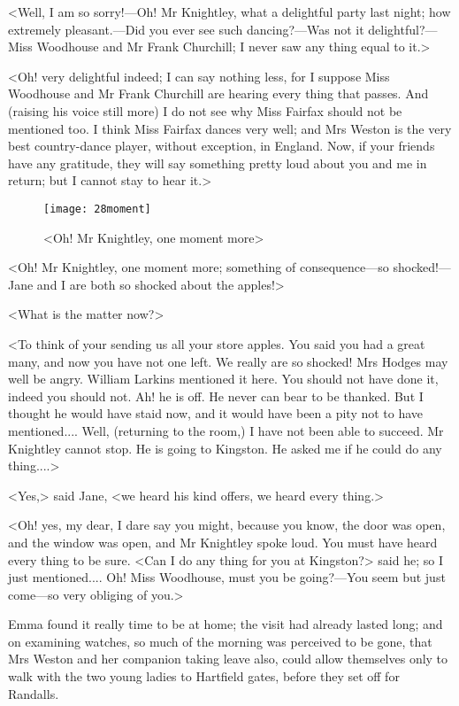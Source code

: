 <Well, I am so sorry!—Oh! Mr Knightley, what a delightful party last night; how extremely pleasant.—Did you ever see such dancing?—Was not it delightful?—Miss Woodhouse and Mr Frank Churchill; I never saw any thing equal to it.>

<Oh! very delightful indeed; I can say nothing less, for I suppose Miss Woodhouse and Mr Frank Churchill are hearing every thing that passes. And (raising his voice still more) I do not see why Miss Fairfax should not be mentioned too. I think Miss Fairfax dances very well; and Mrs Weston is the very best country-dance player, without exception, in England. Now, if your friends have any gratitude, they will say something pretty loud about you and me in return; but I cannot stay to hear it.>


\begin{figure}[tbph]
\centering
\texttt{[image: 28moment]}
\caption{<Oh! Mr Knightley, one moment more>}
\end{figure}

<Oh! Mr Knightley, one moment more; something of consequence—so shocked!—Jane and I are both so shocked about the apples!>

<What is the matter now?>

<To think of your sending us all your store apples. You said you had a great many, and now you have not one left. We really are so shocked! Mrs Hodges may well be angry. William Larkins mentioned it here. You should not have done it, indeed you should not. Ah! he is off. He never can bear to be thanked. But I thought he would have staid now, and it would have been a pity not to have mentioned.... Well, (returning to the room,) I have not been able to succeed. Mr Knightley cannot stop. He is going to Kingston. He asked me if he could do any thing....>

<Yes,> said Jane, <we heard his kind offers, we heard every thing.>

<Oh! yes, my dear, I dare say you might, because you know, the door was open, and the window was open, and Mr Knightley spoke loud. You must have heard every thing to be sure. <Can I do any thing for you at Kingston?> said he; so I just mentioned.... Oh! Miss Woodhouse, must you be going?—You seem but just come—so very obliging of you.>

Emma found it really time to be at home; the visit had already lasted long; and on examining watches, so much of the morning was perceived to be gone, that Mrs Weston and her companion taking leave also, could allow themselves only to walk with the two young ladies to Hartfield gates, before they set off for Randalls.